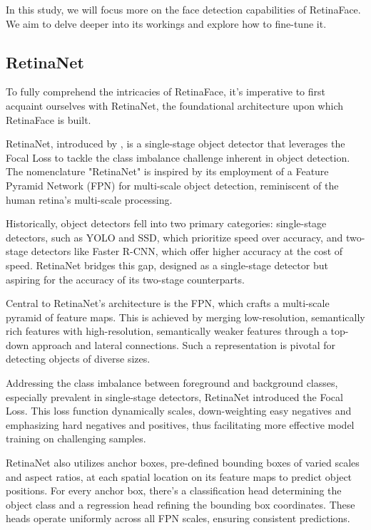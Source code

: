 \documentclass{article}
\begin{document}
In this study, we will focus more on the face detection capabilities of RetinaFace. We aim to delve deeper into its workings and explore how to fine-tune it.

\subsection{RetinaNet}

To fully comprehend the intricacies of RetinaFace, it's imperative to first acquaint ourselves with RetinaNet, the foundational architecture upon which RetinaFace is built. 

RetinaNet, introduced by \cite{lin2017focal}, is a single-stage object detector that leverages the Focal Loss to tackle the class imbalance challenge inherent in object detection. The nomenclature "RetinaNet" is inspired by its employment of a Feature Pyramid Network (FPN) for multi-scale object detection, reminiscent of the human retina's multi-scale processing.

Historically, object detectors fell into two primary categories: single-stage detectors, such as YOLO and SSD, which prioritize speed over accuracy, and two-stage detectors like Faster R-CNN, which offer higher accuracy at the cost of speed. RetinaNet bridges this gap, designed as a single-stage detector but aspiring for the accuracy of its two-stage counterparts.

Central to RetinaNet's architecture is the FPN, which crafts a multi-scale pyramid of feature maps. This is achieved by merging low-resolution, semantically rich features with high-resolution, semantically weaker features through a top-down approach and lateral connections. Such a representation is pivotal for detecting objects of diverse sizes.

Addressing the class imbalance between foreground and background classes, especially prevalent in single-stage detectors, RetinaNet introduced the Focal Loss. This loss function dynamically scales, down-weighting easy negatives and emphasizing hard negatives and positives, thus facilitating more effective model training on challenging samples.

RetinaNet also utilizes anchor boxes, pre-defined bounding boxes of varied scales and aspect ratios, at each spatial location on its feature maps to predict object positions. For every anchor box, there's a classification head determining the object class and a regression head refining the bounding box coordinates. These heads operate uniformly across all FPN scales, ensuring consistent predictions.
\end{document}
